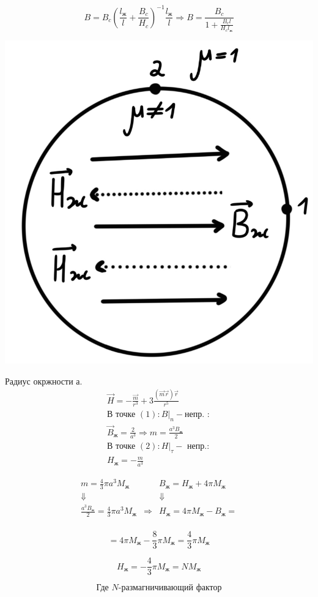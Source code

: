 \[
B=B_c\left( \frac{l_{\text{ж}}}{l}+\frac{B_c}{H_c}  \right)^{-1}\frac{l_{\text{ж}}}{l} \Rightarrow \boxed{B=\frac{B_c}{1+\frac{B_cl}{H_cl_{\text{ж}}} }} 
\]

\begin{minipage}[c]{0.4\textwidth} %
    \includegraphics[width=\textwidth]{im/84.png}%
\end{minipage}%
\hfill
\begin{minipage}[c]{0.6\textwidth} %
    Радиус окржности а.
    \begin{gather*}
        \vec{H}=-\frac{\vec{m}}{r^3}+3\frac{(\vec{m}\vec{r})\vec{r}}{r^5} \\
        \text{В точке }(1): B|_n-\text{непр. }: \\
        \vec{B}_{\text{ж}}=\frac{2}{a^3}\Rightarrow m=\frac{a^3B_{\text{ж}}}{2} \\
        \text{В точке }(2): H|_{\tau}-\text{ непр.}: \\
        H_{\text{ж}}=-\frac{m}{a^3} 
    \end{gather*}
\end{minipage}
\newpage
\[
\begin{array}{ccc}
m=\frac{4}{3}\pi a^3M_{\text{ж}} & & B_{\text{ж}}=H_{\text{ж}}+4\pi M_{\text{ж}} \\
\Downarrow & & \Downarrow \\
\frac{a^3B_{\text{ж}}}{2}=\frac{4}{3}\pi a^3M_{\text{ж}} & \Rightarrow & H_{\text{ж}}=4\pi M_{\text{ж}}-B_{\text{ж}}= \\
\end{array}
\]

\[
=4\pi M_{\text{ж}}-\frac{8}{3}\pi M_{\text{ж}}=\frac{4}{3}\pi M_{\text{ж}}  
\]

\[
H_{\text{ж}}=-\frac{4}{3}\pi M_{\text{ж}}=N M_{\text{ж}}
\]

\[
\text{Где }N\text{-размагничивающий  фактор}
\]